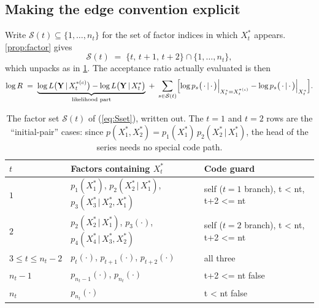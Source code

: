 \documentclass[11pt]{article}
\newcommand{\bY}{\mathbf{Y}}
\newcommand{\given}{\,\vert\,}
\DeclareRobustCommand{\code}[1]{\texttt{#1}}
\newcommand{\eref}[1]{(\ref{#1})}
\def\code#1{#1}%
\theoremstyle{plain}
\theoremstyle{definition}
\theoremstyle{remark}
\begin{document}
\subsection{Making the edge convention explicit}

Write $\mathcal{S}(t) \subseteq \{1,\dots,n_t\}$ for the set of factor indices
in which $X^{*}_t$ appears. \cref{prop:factor} gives
\begin{equation}\label{eq:Sset}
  \mathcal{S}(t) \;=\; \{t,\, t+1,\, t+2\} \cap \{1, \dots, n_t\},
\end{equation}
which unpacks as in \cref{tab:factors}. The acceptance ratio actually
evaluated is then
\begin{equation}\label{eq:logR-latent}
  \log R
  \;=\;
  \underbrace{\log L\bigl(\bY \given X^{*(c)}_t\bigr) - \log L\bigl(\bY \given X^{*}_t\bigr)}_{\text{likelihood part}}
  \;+\;
  \sum_{s \in \mathcal{S}(t)}
  \Bigl[ \log p_s\bigl(\,\cdot \given \cdot\,\bigr)\Big|_{X^{*}_t = X^{*(c)}_t}
       - \log p_s\bigl(\,\cdot \given \cdot\,\bigr)\Big|_{X^{*}_t} \Bigr].
\end{equation}

\begin{table}[htbp]
\centering
\caption{The factor set $\mathcal{S}(t)$ of \eref{eq:Sset}, written out. The
$t = 1$ and $t = 2$ rows are the ``initial-pair'' cases: since
$p(X^{*}_1, X^{*}_2) = p_1(X^{*}_1)\,p_2(X^{*}_2 \given X^{*}_1)$, the head of
the series needs no special code path.}
\label{tab:factors}
\small
\begin{tabular}{@{}l l l@{}}
\toprule
$t$ & Factors containing $X^{*}_t$ & Code guard \\
\midrule
$1$              & $p_1(X^{*}_1)$, \; $p_2(X^{*}_2 \given X^{*}_1)$, \; $p_3(X^{*}_3 \given X^{*}_2, X^{*}_1)$ & self ($t{=}1$ branch), \code{t < nt}, \code{t+2 <= nt} \\
$2$              & $p_2(X^{*}_2 \given X^{*}_1)$, \; $p_3(\cdot)$, \; $p_4(X^{*}_4 \given X^{*}_3, X^{*}_2)$ & self ($t{=}2$ branch), \code{t < nt}, \code{t+2 <= nt} \\
$3 \le t \le n_t - 2$ & $p_t(\cdot)$, \; $p_{t+1}(\cdot)$, \; $p_{t+2}(\cdot)$ & all three \\
$n_t - 1$        & $p_{n_t-1}(\cdot)$, \; $p_{n_t}(\cdot)$ & \code{t+2 <= nt} false \\
$n_t$            & $p_{n_t}(\cdot)$ & \code{t < nt} false \\
\bottomrule
\end{tabular}
\end{table}
\end{document}
